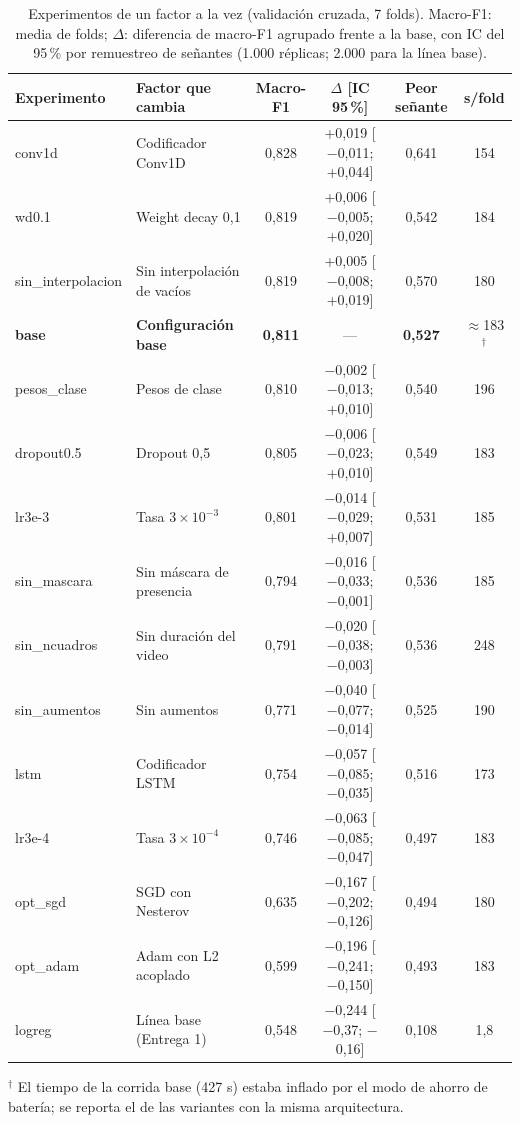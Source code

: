 \documentclass[11pt,a4paper]{article}
\begin{document}
\begin{table}[htbp]
\centering
\caption{Experimentos de un factor a la vez (validación cruzada, 7 folds). Macro-F1: media de folds; $\Delta$: diferencia de macro-F1 agrupado frente a la base, con IC del 95\,\% por remuestreo de señantes (1.000 réplicas; 2.000 para la línea base).}\label{tab:experimentos}
\small
\renewcommand{\arraystretch}{1.12}
\begin{tabularx}{\textwidth}{@{}l Y c c c c@{}}
\toprule
\textbf{Experimento} & \textbf{Factor que cambia} & \textbf{Macro-F1} & \textbf{$\Delta$ [IC 95\,\%]} & \textbf{Peor señante} & \textbf{s/fold}\\
\midrule
conv1d & Codificador Conv1D & 0,828 & +0,019 [$-$0,011; +0,044] & 0,641 & 154\\
wd0.1 & Weight decay 0,1 & 0,819 & +0,006 [$-$0,005; +0,020] & 0,542 & 184\\
sin\_interpolacion & Sin interpolación de vacíos & 0,819 & +0,005 [$-$0,008; +0,019] & 0,570 & 180\\
\textbf{base} & \textbf{Configuración base} & \textbf{0,811} & --- & \textbf{0,527} & $\approx$183$^{\dagger}$\\
pesos\_clase & Pesos de clase & 0,810 & $-$0,002 [$-$0,013; +0,010] & 0,540 & 196\\
dropout0.5 & Dropout 0,5 & 0,805 & $-$0,006 [$-$0,023; +0,010] & 0,549 & 183\\
lr3e-3 & Tasa $3\times10^{-3}$ & 0,801 & $-$0,014 [$-$0,029; +0,007] & 0,531 & 185\\
sin\_mascara & Sin máscara de presencia & 0,794 & $-$0,016 [$-$0,033; $-$0,001] & 0,536 & 185\\
sin\_ncuadros & Sin duración del video & 0,791 & $-$0,020 [$-$0,038; $-$0,003] & 0,536 & 248\\
sin\_aumentos & Sin aumentos & 0,771 & $-$0,040 [$-$0,077; $-$0,014] & 0,525 & 190\\
lstm & Codificador LSTM & 0,754 & $-$0,057 [$-$0,085; $-$0,035] & 0,516 & 173\\
lr3e-4 & Tasa $3\times10^{-4}$ & 0,746 & $-$0,063 [$-$0,085; $-$0,047] & 0,497 & 183\\
opt\_sgd & SGD con Nesterov & 0,635 & $-$0,167 [$-$0,202; $-$0,126] & 0,494 & 180\\
opt\_adam & Adam con L2 acoplado & 0,599 & $-$0,196 [$-$0,241; $-$0,150] & 0,493 & 183\\
logreg & Línea base (Entrega 1) & 0,548 & $-$0,244 [$-$0,37; $-$0,16] & 0,108 & 1,8\\
\bottomrule
\end{tabularx}
\par\smallskip
\begin{minipage}{\textwidth}\footnotesize
$^{\dagger}$ El tiempo de la corrida base (427 s) estaba inflado por el modo de ahorro de batería; se reporta el de las variantes con la misma arquitectura.
\end{minipage}
\end{table}
\end{document}
